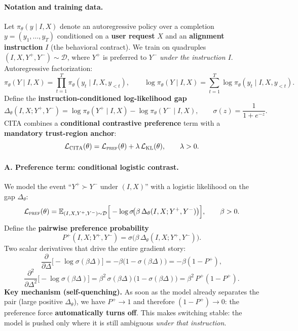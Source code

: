 \paragraph{Notation and training data.}
Let $\pi_\theta(y\mid I,X)$ denote an autoregressive policy over a completion
$y=(y_1,\ldots,y_T)$ conditioned on a \textbf{user request} $X$ and an \textbf{alignment instruction} $I$
(the behavioral contract). We train on quadruples $(I,X,Y^+,Y^-)\sim\mathcal{D}$, where $Y^+$ is preferred to $Y^-$ \emph{under the instruction $I$}.
Autoregressive factorization:
\[
\pi_\theta(Y\mid I,X)
=
\prod_{t=1}^{T}\pi_\theta(y_t\mid I,X,y_{<t}),
\qquad
\log \pi_\theta(Y\mid I,X)
=
\sum_{t=1}^{T}\log \pi_\theta(y_t\mid I,X,y_{<t}).
\]
Define the \textbf{instruction-conditioned log-likelihood gap}
\[
\Delta_\theta(I,X;Y^+,Y^-)
=
\log \pi_\theta(Y^+\mid I,X)-\log \pi_\theta(Y^-\mid I,X),
\qquad
\sigma(z)=\frac{1}{1+e^{-z}}.
\]
CITA combines a \textbf{conditional contrastive preference} term with a \textbf{mandatory trust-region anchor}:
\[
\mathcal{L}_{\textsc{CITA}}(\theta)
=
\mathcal{L}_{\textsc{pref}}(\theta)
+
\lambda\,\mathcal{L}_{\textsc{KL}}(\theta),
\qquad
\lambda>0.
\]

\vspace{-0.35em}
\paragraph{\textbf{A. Preference term: conditional logistic contrast.}}
We model the event ``$Y^+\succ Y^-$ under $(I,X)$'' with a logistic likelihood on the gap $\Delta_\theta$:
\[
\mathcal{L}_{\textsc{pref}}(\theta)
=
\mathbb{E}_{(I,X,Y^+,Y^-)\sim\mathcal{D}}
\Big[
-\log \sigma\!\big(\beta\,\Delta_\theta(I,X;Y^+,Y^-)\big)
\Big],
\qquad
\beta>0.
\]
Define the \textbf{pairwise preference probability}
\[
P^+(I,X;Y^+,Y^-)
=
\sigma\!\big(\beta\,\Delta_\theta(I,X;Y^+,Y^-)\big).
\]
Two scalar derivatives that drive the entire gradient story:
\[
\frac{\partial}{\partial \Delta}\big[-\log \sigma(\beta\Delta)\big]
=
-\beta\big(1-\sigma(\beta\Delta)\big)
=
-\beta(1-P^+),
\]
\[
\frac{\partial^2}{\partial \Delta^2}\big[-\log \sigma(\beta\Delta)\big]
=
\beta^2\,\sigma(\beta\Delta)\big(1-\sigma(\beta\Delta)\big)
=
\beta^2\,P^+(1-P^+).
\]
\textbf{Key mechanism (self-quenching).} As soon as the model already separates the pair (large positive $\Delta_\theta$), we have $P^+\to 1$ and therefore $(1-P^+)\to 0$: the preference force \textbf{automatically turns off}. This makes switching stable: the model is pushed only where it is still ambiguous \emph{under that instruction}.

